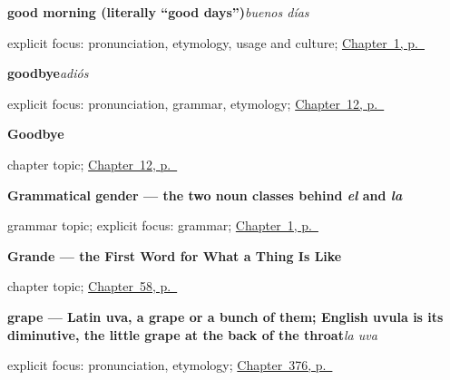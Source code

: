 \noindent\begin{minipage}[t]{\linewidth}
\raggedright
\textbf{good morning (literally \textquotedblleft{}good days\textquotedblright{})}\enspace\emph{buenos días}\par
\footnotesize explicit focus: pronunciation, etymology, usage and culture; \hyperref[ch:first-words]{Chapter~1, p.~\pageref*{ch:first-words}}
\end{minipage}\par\smallskip

\noindent\begin{minipage}[t]{\linewidth}
\raggedright
\textbf{goodbye}\enspace\emph{adiós}\par
\footnotesize explicit focus: pronunciation, grammar, etymology; \hyperref[ch:goodbye]{Chapter~12, p.~\pageref*{ch:goodbye}}
\end{minipage}\par\smallskip

\noindent\begin{minipage}[t]{\linewidth}
\raggedright
\textbf{Goodbye}\par
\footnotesize chapter topic; \hyperref[ch:goodbye]{Chapter~12, p.~\pageref*{ch:goodbye}}
\end{minipage}\par\smallskip

\noindent\begin{minipage}[t]{\linewidth}
\raggedright
\textbf{Grammatical gender — the two noun classes behind \emph{el} and \emph{la}}\par
\footnotesize grammar topic; explicit focus: grammar; \hyperref[ch:first-words]{Chapter~1, p.~\pageref*{ch:first-words}}
\end{minipage}\par\smallskip

\noindent\begin{minipage}[t]{\linewidth}
\raggedright
\textbf{Grande --- the First Word for What a Thing Is Like}\par
\footnotesize chapter topic; \hyperref[ch:grande]{Chapter~58, p.~\pageref*{ch:grande}}
\end{minipage}\par\smallskip

\noindent\begin{minipage}[t]{\linewidth}
\raggedright
\textbf{grape — Latin uva, a grape or a bunch of them; English uvula is its diminutive, the little grape at the back of the throat}\enspace\emph{la uva}\par
\footnotesize explicit focus: pronunciation, etymology; \hyperref[ch:la-harina-y-la-uva]{Chapter~376, p.~\pageref*{ch:la-harina-y-la-uva}}
\end{minipage}\par\smallskip

